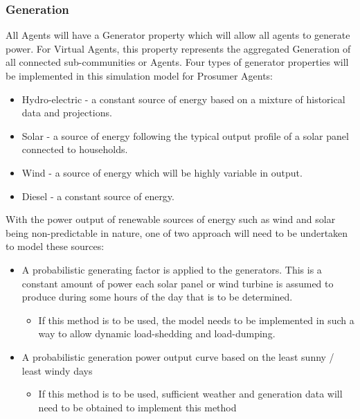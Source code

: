 \subsubsection*{Generation}
All Agents will have a Generator property which will allow all agents to generate power. For Virtual Agents, this property represents the aggregated Generation of all connected sub-communities or Agents. Four types of generator properties will be implemented in this simulation model for Prosumer Agents: 

\begin{itemize}
  \item Hydro-electric - a constant source of energy based on a mixture of historical data and projections.
  \item Solar - a source of energy following the typical output profile of a solar panel connected to households.
  \item Wind - a source of energy which will be highly variable in output.
  \item Diesel - a constant source of energy.
\end{itemize}

With the power output of renewable sources of energy such as wind and solar being non-predictable in nature, one of two approach will need to be undertaken to model these sources:
\begin{itemize}
  
  \item A probabilistic generating factor is applied to the generators. This is a constant amount of power each solar panel or wind turbine is assumed to produce during some hours of the day that is to be determined. 
  
  \begin{itemize}
    \item If this method is to be used, the model needs to be implemented in such a way to allow dynamic load-shedding and load-dumping.  
  \end{itemize}
  
  \item A probabilistic generation power output curve based on the least sunny / least windy days
  
  \begin{itemize}
    \item If this method is to be used, sufficient weather and generation data will need to be obtained to implement this method
  \end{itemize}

\end{itemize}

